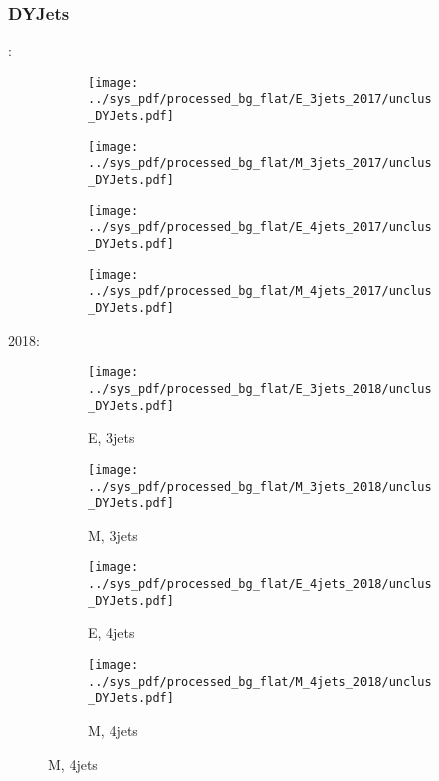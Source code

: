 \documentclass{beamer}
\begin{document}
\begin{frame}
\frametitle{DYJets}
\fontsize{5}{1}:
\begin{figure}
\centering
\begin{subfigure}[b]{0.24\textwidth}
\texttt{[image: ../sys\_pdf/processed\_bg\_flat/E\_3jets\_2017/unclus\_DYJets.pdf]}
\end{subfigure}
\begin{subfigure}[b]{0.24\textwidth}
\texttt{[image: ../sys\_pdf/processed\_bg\_flat/M\_3jets\_2017/unclus\_DYJets.pdf]}
\end{subfigure}
\begin{subfigure}[b]{0.24\textwidth}
\texttt{[image: ../sys\_pdf/processed\_bg\_flat/E\_4jets\_2017/unclus\_DYJets.pdf]}
\end{subfigure}
\begin{subfigure}[b]{0.24\textwidth}
\texttt{[image: ../sys\_pdf/processed\_bg\_flat/M\_4jets\_2017/unclus\_DYJets.pdf]}
\end{subfigure}
\end{figure}
2018:
\begin{figure}
\centering
\begin{subfigure}[b]{0.24\textwidth}
\texttt{[image: ../sys\_pdf/processed\_bg\_flat/E\_3jets\_2018/unclus\_DYJets.pdf]}
\captionsetup{font=tiny}
\caption{E, 3jets}
\end{subfigure}
\begin{subfigure}[b]{0.24\textwidth}
\texttt{[image: ../sys\_pdf/processed\_bg\_flat/M\_3jets\_2018/unclus\_DYJets.pdf]}
\captionsetup{font=tiny}
\caption{M, 3jets}
\end{subfigure}
\begin{subfigure}[b]{0.24\textwidth}
\texttt{[image: ../sys\_pdf/processed\_bg\_flat/E\_4jets\_2018/unclus\_DYJets.pdf]}
\captionsetup{font=tiny}
\caption{E, 4jets}
\end{subfigure}
\begin{subfigure}[b]{0.24\textwidth}
\texttt{[image: ../sys\_pdf/processed\_bg\_flat/M\_4jets\_2018/unclus\_DYJets.pdf]}
\captionsetup{font=tiny}
\caption{M, 4jets}
\end{subfigure}
\end{figure}
\end{frame}
\end{document}
